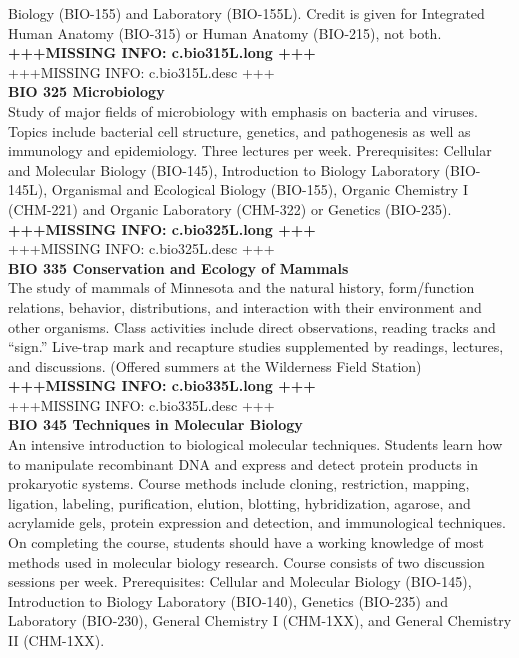 \documentclass[
  letterpaper,
]{scrbook}
\begin{document}
Biology (BIO-155) and Laboratory (BIO-155L). Credit is given for
Integrated Human Anatomy (BIO-315) or Human Anatomy (BIO-215), not
both.\\
\textbf{+++MISSING INFO: c.bio315L.long +++}\\
+++MISSING INFO: c.bio315L.desc +++\\
\textbf{BIO 325 Microbiology}\\
Study of major fields of microbiology with emphasis on bacteria and
viruses. Topics include bacterial cell structure, genetics, and
pathogenesis as well as immunology and epidemiology. Three lectures per
week. Prerequisites: Cellular and Molecular Biology (BIO-145),
Introduction to Biology Laboratory (BIO-145L), Organismal and Ecological
Biology (BIO-155), Organic Chemistry I (CHM-221) and Organic Laboratory
(CHM-322) or Genetics (BIO-235).\\
\textbf{+++MISSING INFO: c.bio325L.long +++}\\
+++MISSING INFO: c.bio325L.desc +++\\
\textbf{BIO 335 Conservation and Ecology of Mammals}\\
The study of mammals of Minnesota and the natural history, form/function
relations, behavior, distributions, and interaction with their
environment and other organisms. Class activities include direct
observations, reading tracks and ``sign.'' Live-trap mark and recapture
studies supplemented by readings, lectures, and discussions. (Offered
summers at the Wilderness Field Station)\\
\textbf{+++MISSING INFO: c.bio335L.long +++}\\
+++MISSING INFO: c.bio335L.desc +++\\
\textbf{BIO 345 Techniques in Molecular Biology}\\
An intensive introduction to biological molecular techniques. Students
learn how to manipulate recombinant DNA and express and detect protein
products in prokaryotic systems. Course methods include cloning,
restriction, mapping, ligation, labeling, purification, elution,
blotting, hybridization, agarose, and acrylamide gels, protein
expression and detection, and immunological techniques. On completing
the course, students should have a working knowledge of most methods
used in molecular biology research. Course consists of two discussion
sessions per week. Prerequisites: Cellular and Molecular Biology
(BIO-145), Introduction to Biology Laboratory (BIO-140), Genetics
(BIO-235) and Laboratory (BIO-230), General Chemistry I (CHM-1XX), and
General Chemistry II (CHM-1XX).\\
\end{document}
